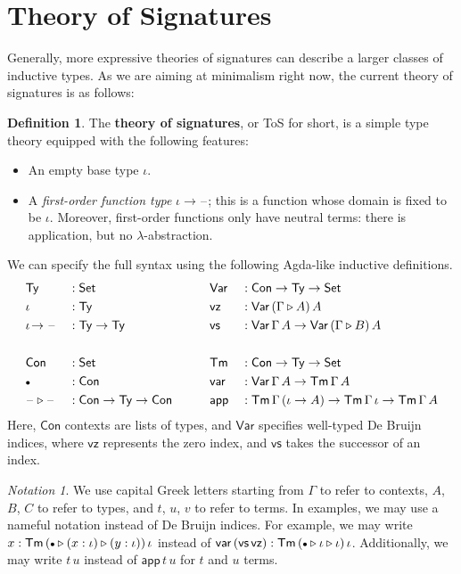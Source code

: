 \documentclass[12pt,a4paper,twoside,openany]{book}
\theoremstyle{remark}
\newtheorem{notation}{Notation}
\theoremstyle{definition}
\newtheorem{mydefinition}{Definition}
\newcommand{\ms}[1]{\mathsf{#1}}
\newcommand{\Con}{\mathsf{Con}}
\newcommand{\Tm}{\mathsf{Tm}}
\newcommand{\Ty}{\mathsf{Ty}}
\newcommand{\blank}{\mathord{\hspace{1pt}\text{--}\hspace{1pt}}}
\newcommand{\Set}{\mathsf{Set}}
\newcommand{\ext}{\triangleright}
\newcommand{\emptycon}{\scaleobj{.75}\bullet}
\newcommand{\Var}{\ms{Var}}
\newcommand{\var}{\ms{var}}
\newcommand{\app}{\ms{app}}
\newcommand{\vz}{\ms{vz}}
\newcommand{\vs}{\ms{vs}}
\begin{document}
\section{Theory of Signatures}
\label{sec:simple-signatures}

Generally, more expressive theories of signatures can describe a larger classes
of inductive types. As we are aiming at minimalism right now, the current theory
of signatures is as follows:

\begin{mydefinition}
The \textbf{theory of signatures}, or ToS for short, is a simple type theory
equipped with the following features:
  \begin{itemize}
    \item An empty base type $\iota$.
    \item A \emph{first-order function type} $\iota\!\to\!\blank$; this is a
      function whose domain is fixed to be $\iota$. Moreover, first-order functions only
      have neutral terms: there is application, but no $\lambda$-abstraction.
  \end{itemize}
\end{mydefinition}

We can specify the full syntax using the following Agda-like inductive definitions.
\begin{alignat*}{4}
  & \Ty              &&: \Set           && \Var &&: \Con \to \Ty \to \Set \\
  & \iota            &&: \Ty            && \vz  &&: \Var\,(\Gamma \ext A)\,A \\
  & \iota\!\to\blank &&: \Ty \to \Ty    && \vs  &&: \Var\,\Gamma\,A \to \Var\,(\Gamma \ext B)\,A\\
  & && && &&\\
  & \Con             &&: \Set           && \Tm  &&: \Con \to \Ty \to \Set \\
  & \emptycon        &&: \Con           && \var &&: \Var\,\Gamma\,A \to \Tm\,\Gamma\,A \\
  & \blank\ext\blank &&: \Con \to \Ty \to \Con \hspace{2em} && \app &&: \Tm\,\Gamma\,(\iota\to A) \to \Tm\,\Gamma\,\iota
                                                           \to \Tm\,\Gamma\,A
\end{alignat*}
Here, $\Con$ contexts are lists of types, and $\Var$ specifies well-typed De Bruijn indices, where
$\vz$ represents the zero index, and $\vs$ takes the successor of an index.

\begin{notation} We use capital Greek letters starting from $\Gamma$ to refer to contexts, $A$, $B$, $C$ to
refer to types, and $t$, $u$, $v$ to refer to terms. In examples, we may use a
nameful notation instead of De Bruijn indices. For example, we may write $x :
\Tm\,(\emptycon \ext (x : \iota) \ext (y : \iota))\,\iota$ instead of $\var\,(\vs\,\vz)
: \Tm\,(\emptycon \ext \iota \ext \iota)\,\iota$. Additionally, we may write
$t\,u$ instead of $\app\,t\,u$ for $t$ and $u$ terms.
\end{notation}
\end{document}
